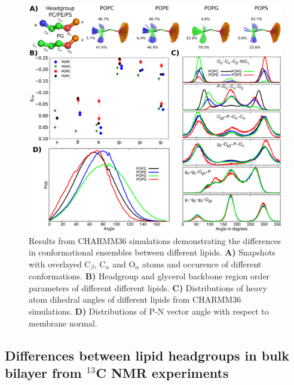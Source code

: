 \documentclass[aps,prl,superscriptaddress,twocolumn]{revtex4}
\begin{document}
\begin{figure}[bt]
  \centering
   \includegraphics[width=18.0cm]{./Figs/figure2.eps}
   \caption{\label{structures}
     Results from CHARMM36 simulations demonstrating the differences in conformational ensembles between different lipids. 
     \textbf{A)} Snapshots with overlayed C$_\beta$, C$_\alpha$ and O$_\alpha$ atoms and occurence of different conformations.
     \textbf{B)} Headgroup and glycerol backbone region order parameters of different different lipids.
     \textbf{C)} Distributions of heavy atom dihedral angles of different lipids from CHARMM36 simulations.
     \textbf{D)} Distributions of P-N vector angle with respect to membrane normal.
  }
\end{figure}


\subsection{Differences between lipid headgroups in bulk bilayer from $^{13}$C NMR experiments}
\end{document}
